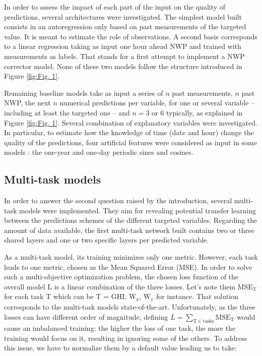 \documentclass{article}
\newcommand{\saut}{\vspace{10px}}
\begin{document}
\saut

In order to assess the impact of each part of the input on the quality of predictions, several architectures were investigated.
The simplest model built consists in an autoregression only based on past measurements of the targeted value.
It is meant to estimate the role of observations. A second basis corresponds to a linear regression taking as input
one hour ahead NWP and trained with measurements as labels. That stands for a first attempt to implement a
NWP corrector model. None of these two models follow the structure introduced in Figure \ref{fig:Fig. 1}.

\saut

Remaining baseline models take as input a series of $n$ past measurements, $n$ past NWP, the next $n$
numerical predictions per variable, for one or several variable -- including at least the targeted one -- and $n = 3$ or
$6$ typically, as explained in Figure \ref{fig:Fig. 1}. Several combination of explanatory variables were investigated.
In particular, to estimate how the knowledge of time (date and hour) change the quality of the predictions,
four artificial features were considered as input in some models : the one-year and one-day periodic sines and cosines.

\subsection*{Multi-task models}

In order to answer the second question raised by the introduction, several multi-task models were implemented.
They aim for revealing potential transfer learning between the predictions schemes of the different targeted variables.
Regarding the amount of data available, the first multi-task network built contains two or three shared layers and
one or two specific layers per predicted variable.

\newpage

As a multi-task model, its training minimizes only one metric. However, each task leads to one metric, chosen as
the Mean Squared Error (MSE). In order to solve such a multi-objective optimization problem, the chosen loss
function of the overall model L is a linear combination of the three losses. Let's note them
$\mathrm{MSE}_{\mathrm T}$
for each task T which can be T = GHI, $\mathrm W_{\mathrm x}$, $\mathrm W_{\mathrm y}$ for instance.
That solution corresponds to the multi-task models state-of-the-art.
Unfortunately, as the three losses can have different order of magnitude, defining
$L = \sum_{\mathrm T \in \mathrm{tasks}} \mathrm{MSE}_{\mathrm T}$ would cause an imbalanced training: the
higher the loss of one task, the more the training would focus on it, resulting in ignoring some of the others. To address
this issue, we have to normalize them by a default value leading us to take:
\end{document}
